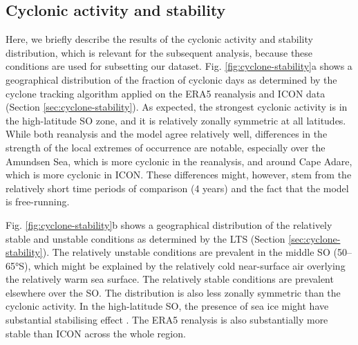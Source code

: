 \documentclass[12pt,a4paper]{article}
\begin{document}
\subsection{Cyclonic activity and stability}

Here, we briefly describe the results of the cyclonic activity and stability
distribution, which is relevant for the subsequent analysis, because these
conditions are used for subsetting our dataset. Fig.
\ref{fig:cyclone-stability}a shows a geographical distribution of the fraction
of cyclonic days as determined by the cyclone tracking algorithm applied on the
ERA5 reanalysis and ICON data (Section \ref{sec:cyclone-stability}). As
expected, the strongest cyclonic activity is in the high-latitude SO zone, and
it is relatively zonally symmetric at all latitudes.  While both reanalysis and
the model agree relatively well, differences in the strength of the local
extremes of occurrence are notable, especially over the Amundsen Sea, which is
more cyclonic in the reanalysis, and around Cape Adare, which is more cyclonic
in ICON. These differences might, however, stem from the relatively short time
periods of comparison (4 years) and the fact that the model is free-running.

Fig. \ref{fig:cyclone-stability}b shows a geographical distribution of the
relatively stable and unstable conditions as determined by the LTS (Section
\ref{sec:cyclone-stability}).  The relatively unstable conditions are prevalent
in the middle SO (50--65°S), which might be explained by the relatively cold
near-surface air overlying the relatively warm sea surface. The relatively
stable conditions are prevalent elsewhere over the SO. The distribution is also
less zonally symmetric than the cyclonic activity.  In the high-latitude SO,
the presence of sea ice might have substantial stabilising effect
\citep{knight2024}. The ERA5 renalysis is also substantially more stable than
ICON across the whole region.
\end{document}
